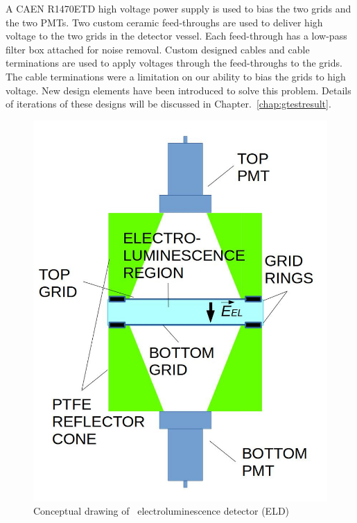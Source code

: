 A CAEN R1470ETD high voltage power supply is used to bias the two grids and the two PMTs. Two custom ceramic feed-throughs are used to deliver high voltage to the two grids in the detector vessel. Each feed-through has a low-pass filter box attached for noise removal. Custom designed cables and cable terminations are used to apply voltages through the feed-throughs to the grids. The cable terminations were a limitation on our ability to bias the grids to high voltage. New design elements have been introduced to solve this problem. Details of iterations of these designs will be discussed in Chapter.~\ref{chap:gtestresult}.    

\begin{figure}[!tb]
\centering
\includegraphics[width=\halfwidth,clip,trim={0 0 0 0},angle=0,origin=c]{Figures/GasTest/WeiDrawEvent/BasicELD.jpg}
\caption[\gtest\ electroluminescence detector.]{Conceptual drawing of \gtest\ electroluminescence detector (ELD)}
\label{fig:BasicELD}
\end{figure}

